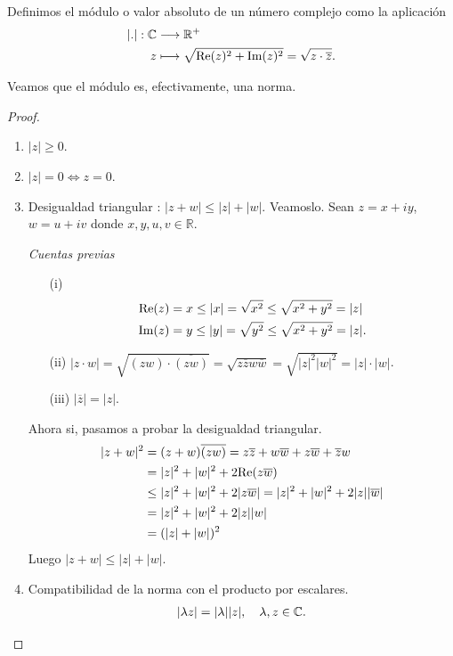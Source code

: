 \begin{defi}
    Definimos el módulo o valor absoluto de un número complejo como la aplicación
    \begin{align*}
        |.| : \mathbb{C} & \longrightarrow\mathbb{R}^+                                           \\
        z          & \longmapsto \sqrt{\text{Re}(z)^2 + \text{Im}(z)^2} = \sqrt{z \cdot \overline{z}}.
    \end{align*}
\end{defi}
Veamos que el módulo es, efectivamente, una norma.
\begin{proof}
    \begin{enumerate}
        \item $|z| \ge 0$.
        \item $|z| = 0 \Longleftrightarrow z = 0$.
        \item Desigualdad triangular : $|z + w| \leq |z| + |w|$. Veamoslo. Sean $z = x + iy$, $w = u +iv$ donde $x,y,u,v \in \mathbb{R}$.

              \textit{Cuentas previas}
              \begin{enumerate}
                  \item[(i)]
                        \begin{align*}
                            \text{Re}(z) & = x \leq |x| = \sqrt{x^2} \leq \sqrt{x^2 + y^2} = |z|  \\
                            \text{Im}(z) & = y \leq |y| = \sqrt{y^2} \leq \sqrt{x^2 + y^2} = |z|.
                        \end{align*}
                  \item[(ii)] $|z \cdot w| = \sqrt{(zw) \cdot \overline{(zw)}} = \sqrt{z\overline{z}w\overline{w}} = \sqrt{|z|^2|w|^2} = |z|\cdot |w|$.
                  \item[(iii)] $|\overline{z}| = |z|$.
              \end{enumerate}
              Ahora si, pasamos a probar la desigualdad triangular.
              \begin{align*}
                  |z+w|^2 & = (z+w)\overline{(zw)} = z\overline{z} + w\overline{w} + z\overline{w} + \overline{z}w \\
                          & = |z|^2 + |w|^2 + 2\text{Re}(z\overline{w})                                                  \\
                          & \leq |z|^2 + |w|^2 + 2|z\overline{w}| = |z|^2 + |w|^2 + 2|z||\overline{w}|             \\
                          & = |z|^2 + |w|^2 + 2|z||w|                                                              \\
                          & = (|z| + |w|)^2
              \end{align*}
              Luego $|z+w| \leq |z| + |w|$.
        \item Compatibilidad de la norma con el producto por escalares.
              \begin{align*}
                  |\lambda z| = |\lambda| |z|, \ \ \ \lambda, z \in \mathbb{C}.
              \end{align*}
    \end{enumerate}
\end{proof}

